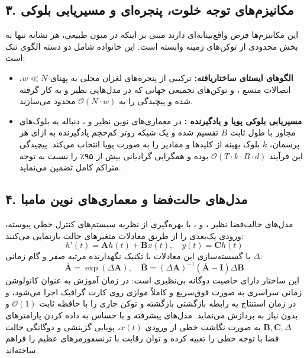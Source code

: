 \documentclass[12pt,a4paper]{report}
\theoremstyle{definition}
\begin{document}
\subsection{۳. مکانیزم‌های توجه خلوت، پنجره‌ای و مسیریابی بلوکی }
این مکانیزم‌ها فرض واقع‌بینانه‌ای دارند مبنی بر اینکه در متون طبیعی، هر نشانه تنها به بخش محدودی از توکن‌های زمینه وابسته است. این خانواده شامل دو دسته الگوی تنک است:
\begin{itemize}
    \item \textbf{الگوهای ایستای ساختاریافته:} ترکیبی از پنجره‌های لغزان محلی  به پهنای $w \ll N$، اتصالات متسع ، و توکن‌های تجمیعی جهانی  که در مدل‌هایی نظیر  \cite{beltagy2020longformer} و  \cite{zaheer2020big} به کار گرفته شده و پیچیدگی را به $\mathcal{O}(N \cdot w)$ محدود می‌سازند.
    \item \textbf{مسیریابی بلوکی پویا و یادگیرنده :} در معماری‌های نوین نظیر  و ، دنباله به بلوک‌های مجاور با طول ثابت $B$ تقسیم شده و یک شبکه روتر کم‌حجم یادگیرنده به ازای هر پرسمان، $k$ بلوک بهینه از کلیدها و مقادیر را به صورت پویا انتخاب می‌کند. پیچیدگی این فرآیند $\mathcal{O}(T \cdot k \cdot B \cdot d)$ بوده و همگرایی گرادیانی بیش از ۹۵٪ را نسبت به توجه متراکم کامل تضمین می‌نماید.
\end{itemize}

\subsection{۴. مدل‌های حالت‌فضا و معماری‌های نوین مامبا }
مدل‌های حالت‌فضا  نظیر  \cite{gu2023mamba}،  \cite{dao2024mamba2} و  \cite{dong2024hgrn2}، با بهره‌گیری از نظریه سیستم‌های کنترل خطی پیوسته، ورودی یک‌بعدی را از طریق معادلات متغیرهای حالت بازنمایی می‌کنند:
\begin{equation}
h'(t) = \mathbf{A} h(t) + \mathbf{B} x(t), \quad y(t) = \mathbf{C} h(t)
\end{equation}
با گسسته‌سازی این معادلات با تکنیک نگهدارنده مرتبه صفر  و گام زمانی $\Delta$:
\begin{equation}
\overline{\mathbf{A}} = \exp(\Delta \mathbf{A}), \quad \overline{\mathbf{B}} = (\Delta \mathbf{A})^{-1} (\overline{\mathbf{A}} - \mathbf{I}) \Delta \mathbf{B}
\end{equation}
این ساختار دارای خاصیت دوگانه بی‌نظیری است: در زمان آموزش به عنوان کانولوشن زمانی سراسری به صورت فوق‌سریع و کاملاً موازی روی کارت گرافیک اجرا می‌شود، و در زمان استنتاج به رابطه بازگشتی بازگشته و توکن جاری را با حافظه ثابت $\mathcal{O}(1)$ و بدون نیاز به  پردازش می‌نماید. مدل‌های پیشرفته  و  با حساس به داده کردن پارامترهای $\mathbf{B}, \mathbf{C}, \Delta$ به صورت نگاشت خطی از ورودی $x(t)$، پویایی گزینشی  و دوگانگی حالت فضا با توجه خطی را تعبیه کرده و توان رقابت با ترنسفورمرهای عظیم را فراهم ساخته‌اند.
\end{document}
